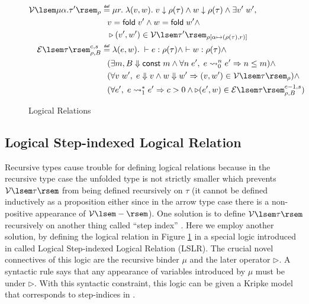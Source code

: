 \documentclass[preprint]{sigplanconf}
\newcommand{\symfold}{\mathsf{fold\;}}
\newcommand{\relV}[1]{\mathcal{V}\lsem#1\rsem}
\newcommand{\relE}[1]{\mathcal{E}\lsem#1\rsem}
\newcommand{\later}{\triangleright}
\newcommand\defeq{\mathrel{\overset{\makebox[0pt]{\mbox{\normalfont\tiny\sffamily def}}}{=}}}
\begin{document}
\begin{figure}
{\begin{align*}
  \relV{\mu\alpha.\tau'}_\rho &\defeq \mu r.\;\lambda (v,w).\; v \downarrow \rho(\tau) \wedge w \downarrow \rho(\tau) \wedge \exists v'\;w',\; \\
  & \hspace{.1in} v = \symfold v' \wedge w = \symfold w' \wedge \\
  & \hspace{.1in} \later (v',w') \in \relV{\tau'}_{\rho[\alpha\mapsto(\rho(\tau),r)]} \\
  \relE{\tau}^{c,s}_{\rho,B} &\defeq \lambda(e,w).\;\vdash e:\rho(\tau) \wedge \vdash w:\rho(\tau) \wedge \\
  & \hspace{.1in} (\exists m, B \Downarrow \mathsf{const}\;m \wedge \forall n\;e',\; e\leadsto^n_0 e' \Rightarrow n \leq m) \wedge \\
  & \hspace{.1in} (\forall v\;w',\; e\Downarrow v \wedge w\Downarrow w'\Rightarrow (v,w') \in \relV{\tau}_\rho) \wedge \\
  & \hspace{.1in} (\forall e',\; e\leadsto^*_1 e' \Rightarrow c > 0 \wedge \later (e',w)\in \relE{\tau}^{c-1,s}_{\rho,B})
\end{align*}
}
\caption{\label{lrel}Logical Relations}
\end{figure}

\subsection {Logical Step-indexed Logical Relation}
Recursive types cause trouble for defining logical relations because in the recursive type case the unfolded type is not strictly smaller which prevents $\relV{\tau}$ from being defined recursively on $\tau$ (it cannot be defined inductively as a proposition either since in the arrow type case there is a non-positive appearance of $\relV{-}$). One solution is to define $\relV{\tau}$ recursively on another thing called ``step index'' \cite{ahmed2006step}. Here we employ another solution, by defining the logical relation in Figure \ref{lrel} in a special logic introduced in \cite{dreyer2009logical} called Logical Step-indexed Logical Relation (LSLR). The crucial novel connectives of this logic are the recursive binder $\mu$ and the later operator $\later$. A syntactic rule says that any appearance of variables introduced by $\mu$ must be under $\later$. With this syntactic constraint, this logic can be given a Kripke model that corresponds to step-indices in \cite{ahmed2006step}. 
\end{document}
